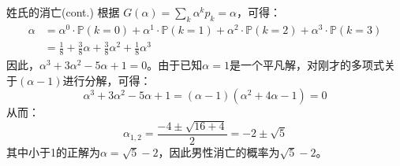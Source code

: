 \documentclass[t]{beamer}
\renewcommand{\Pr}{\mathbb{P}}
\begin{document}
\begin{frame}{姓氏的消亡(cont.)}
    根据 $G(\alpha)=\displaystyle\sum_k \alpha^kp_k=\alpha$，可得：
    \[\begin{split}
    \alpha&= \alpha^0\cdot  \Pr(k=0)+\alpha^1\cdot  \Pr(k=1)+\alpha^2 \cdot \Pr(k=2)+\alpha^3\cdot \Pr(k=3) \\
    &=\frac{1}{8}+\frac{3}{8}\alpha+\frac{3}{8}\alpha^2+\frac{1}{8}\alpha^3
    \end{split}\]
    因此，$\alpha^3+3\alpha^2-5\alpha+1=0$。由于已知$\alpha=1$是一个平凡解，对刚才的多项式关于$(\alpha-1)$进行分解，可得：
    \[\alpha^3+3\alpha^2-5\alpha+1=(\alpha-1)(\alpha^2+4\alpha-1)=0 \]
    从而：\[\alpha_{1,2}=\frac{-4\pm\sqrt{16+4}}{2}=-2\pm\sqrt{5} \]
    其中小于1的正解为$\alpha=\sqrt{5}-2$，因此男性消亡的概率为$\sqrt{5}-2$。
\end{frame}
\end{document}
